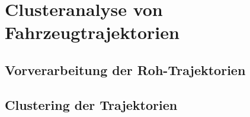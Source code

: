 

\chapter{Clusteranalyse von Fahrzeugtrajektorien}
\label{cha:realisation_clustering}


\section{Vorverarbeitung der Roh-Trajektorien}
\label{sec:realisation_preprocessing}


\section{Clustering der Trajektorien}
\label{sec:realisation_clustering}



